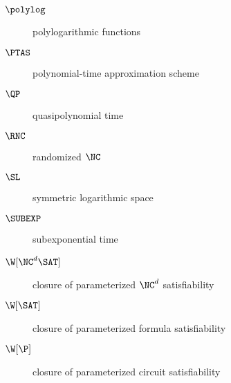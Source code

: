 \begin{description}
\item[$\polylog$] polylogarithmic functions
\item[$\PTAS$] polynomial-time approximation scheme
\item[$\QP$] quasipolynomial time
\item[$\RNC$] randomized $\NC$
\item[$\SL$] symmetric logarithmic space
\item[$\SUBEXP$] subexponential time
\item[{$\W[\NC^d \SAT]$}] closure of parameterized $\NC^d$ satisfiability
\item[{$\W[\SAT]$}] closure of parameterized formula satisfiability
\item[{$\W[\P]$}] closure of parameterized circuit satisfiability
\end{description}
\doublespacing
